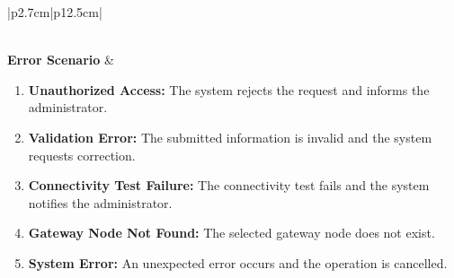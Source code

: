 \begin{table}[H]
\begin{tabular}{|p{2.7cm}|p{12.5cm}|}
\begin{minipage}[t]{\linewidth}
                                  \end{minipage} \\ \hline
        \textbf{Error Scenario} & \begin{minipage}[t]{\linewidth}
                                      \begin{enumerate}[topsep=0pt,itemsep=1pt,parsep=0pt,partopsep=0pt]
                                          \item \textbf{Unauthorized Access:} The system rejects the request and informs the administrator.
                                          \item \textbf{Validation Error:} The submitted information is invalid and the system requests correction.
                                          \item \textbf{Connectivity Test Failure:} The connectivity test fails and the system notifies the administrator.
                                          \item \textbf{Gateway Node Not Found:} The selected gateway node does not exist.
                                          \item \textbf{System Error:} An unexpected error occurs and the operation is cancelled.
                                      \end{enumerate}
                                  \end{minipage} \\ \hline
    \end{tabular}
    \label{tab:admin-verify-unverify-gateway}
\end{table}
\fi

